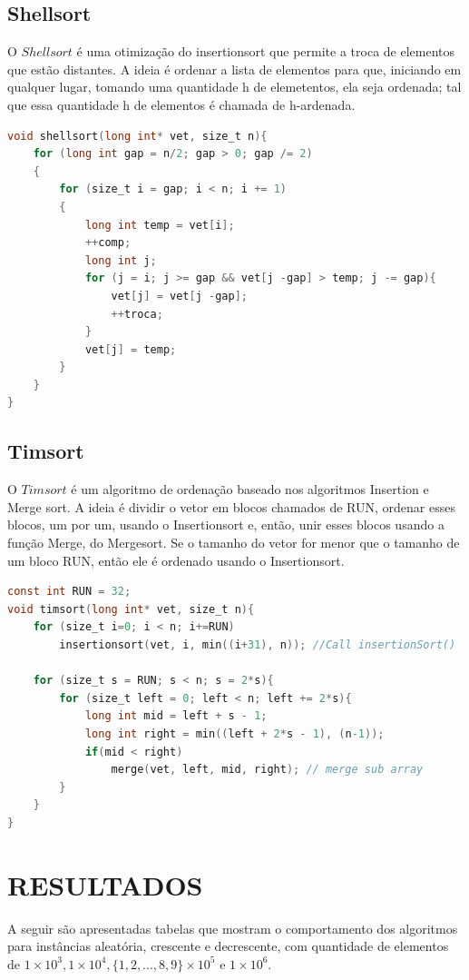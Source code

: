 \documentclass[report]{uftex}
\begin{document}
\section{Shellsort}
O $Shellsort$ é uma otimização do insertionsort que permite a troca de elementos que estão distantes. A ideia é ordenar a lista de elementos para que, iniciando em qualquer lugar, tomando uma quantidade h de elemetentos, ela seja ordenada; tal que essa quantidade h de elementos é chamada de h-ardenada.\\

\begin{lstlisting}[language=C]
void shellsort(long int* vet, size_t n){
    for (long int gap = n/2; gap > 0; gap /= 2)
    {
        for (size_t i = gap; i < n; i += 1)
        {
            long int temp = vet[i];
            ++comp;
            long int j;
            for (j = i; j >= gap && vet[j -gap] > temp; j -= gap){
                vet[j] = vet[j -gap];
                ++troca;
            }
            vet[j] = temp;
        }
    }
}
\end{lstlisting}


\section{Timsort}
O $Timsort$ é um algoritmo de ordenação baseado nos algoritmos Insertion e Merge sort. A ideia é dividir o vetor em blocos chamados de RUN, ordenar esses blocos, um por um, usando o Insertionsort e, então, unir esses blocos usando a função Merge, do Mergesort. Se o tamanho do vetor for menor que o tamanho de um bloco RUN, então ele é ordenado usando o Insertionsort.\\

\begin{lstlisting}[language=C]
const int RUN = 32;
void timsort(long int* vet, size_t n){
    for (size_t i=0; i < n; i+=RUN)
        insertionsort(vet, i, min((i+31), n)); //Call insertionSort()

    for (size_t s = RUN; s < n; s = 2*s){
        for (size_t left = 0; left < n; left += 2*s){
            long int mid = left + s - 1; 
            long int right = min((left + 2*s - 1), (n-1));
            if(mid < right)
                merge(vet, left, mid, right); // merge sub array
        }
    }
}
\end{lstlisting}


\chapter{RESULTADOS}
A seguir são apresentadas tabelas que mostram o comportamento dos algoritmos para instâncias aleatória, crescente e decrescente, com quantidade de elementos de $1\times10^{3}, 1\times10^{4}, \{1,2,...,8,9\}\times10^{5}$ e $1\times10^{6}$. \\ 
\end{document}
